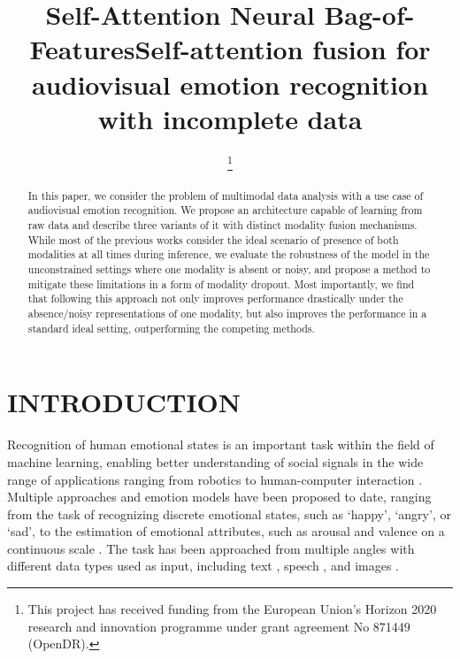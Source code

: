\documentclass[a4paper,conference]{IEEEtran}
\begin{document}
\title{Self-Attention Neural Bag-of-Features}

\author{\thanks{This project has received funding from the European
Union’s Horizon 2020 research and innovation programme
under grant agreement No 871449 (OpenDR).}
}















\title{Self-attention fusion for audiovisual emotion recognition with incomplete data}
\maketitle

\begin{abstract}
In this paper, we consider the problem of multimodal data analysis with a use case of audiovisual emotion recognition. We propose an architecture capable of learning from raw data and describe three variants of it with distinct modality fusion mechanisms. While most of the previous works consider the ideal scenario of presence of both modalities at all times during inference, we evaluate the robustness of the model in the unconstrained settings where one modality is absent or noisy, and propose a method to mitigate these limitations in a form of modality dropout. Most importantly, we find that following this approach not only improves performance drastically under the absence/noisy representations of one modality, but also improves the performance in a standard ideal setting, outperforming the competing methods.

\end{abstract}
\section{INTRODUCTION}

Recognition of human emotional states is an important task within the field of machine learning,  enabling better understanding of social signals in the wide range of applications ranging from robotics to human-computer interaction \cite{liu2017facial, chen2019automatic}. Multiple approaches and emotion models have been proposed to date, ranging from the task of recognizing discrete emotional states, such as `happy', `angry', or `sad', to the estimation of emotional attributes, such as arousal and valence on a continuous scale \cite{dzedzickis2020human, mollahosseini2017affectnet}. The task has been approached from multiple angles with different data types used as input, including text \cite{soleymani2017survey}, speech \cite{khalil2019speech}, and images \cite{efficientface}. 
\end{document}
